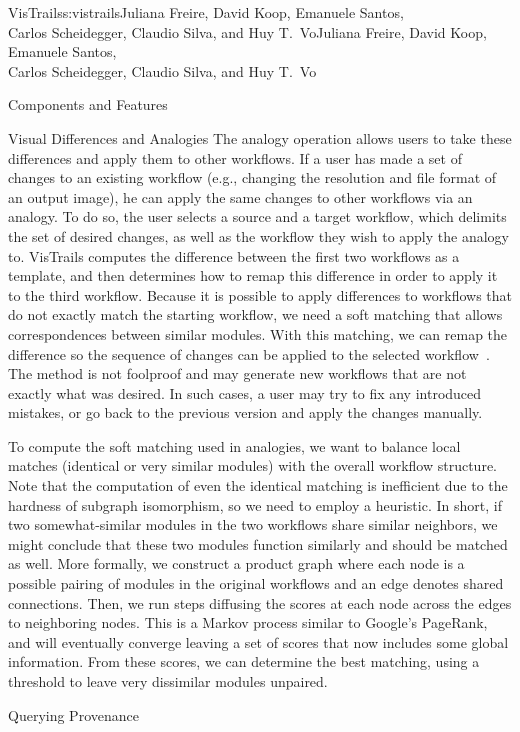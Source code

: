 \begin{aosachaptertoc}{VisTrails}{s:vistrails}{Juliana Freire, David Koop, Emanuele Santos, \\ Carlos Scheidegger, Claudio Silva, and Huy T.\ Vo}{Juliana Freire, David Koop, Emanuele Santos, \\ \hspace*{0.9cm} Carlos Scheidegger, Claudio Silva, and Huy T.\ Vo}
\begin{aosasect1}{Components and Features}
\begin{aosasect2}{Visual Differences and Analogies}
The analogy operation allows users to take these differences and apply
them to other workflows.  If a user has made a set of changes to an
existing workflow (e.g., changing the resolution and file format of an
output image), he can apply the same changes to other workflows via an
analogy.  To do so, the user selects a source and a target workflow,
which delimits the set of desired changes, as well as the workflow
they wish to apply the analogy to.  VisTrails computes the difference
between the first two workflows as a template, and then determines 
how to remap this difference in order to apply it to the third
workflow.  Because it is possible to apply differences to workflows
that do not exactly match the starting workflow, we need a soft
matching that allows correspondences between similar modules.  With
this matching, we can remap the difference so the sequence of changes
can be applied to the selected
workflow~\cite{bib:scheidegger:analogy}.  The method is not foolproof
and may generate new workflows that are not exactly what was desired.
In such cases, a user may try to fix any introduced mistakes, or go
back to the previous version and apply the changes manually.

To compute the soft matching used in analogies, we want to balance
local matches (identical or very similar modules) with the overall
workflow structure.  Note that the computation of even the identical
matching is inefficient due to the hardness of subgraph isomorphism,
so we need to employ a heuristic.  In short, if two somewhat-similar
modules in the two workflows share similar neighbors, we might
conclude that these two modules function similarly and should be
matched as well.  More formally, we construct a product graph where
each node is a possible pairing of modules in the original workflows
and an edge denotes shared connections.  Then, we run steps diffusing
the scores at each node across the edges to neighboring nodes.  This
is a Markov process similar to Google's PageRank, and will eventually
converge leaving a set of scores that now includes some global
information.  From these scores, we can determine the best matching,
using a threshold to leave very dissimilar modules unpaired.

\end{aosasect2}

\begin{aosasect2}{Querying Provenance}


\end{aosasect2}
\end{aosasect1}
\end{aosachaptertoc}

